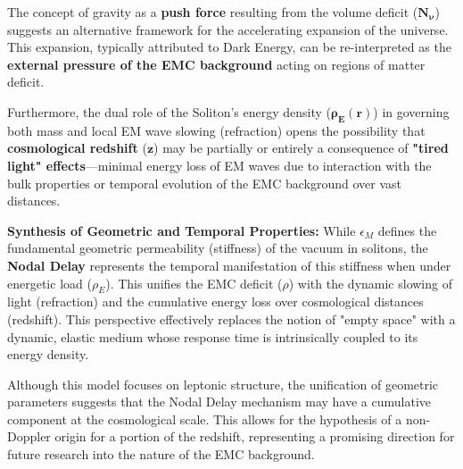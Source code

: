\documentclass[10pt,a4paper]{article}
\begin{document}
The concept of gravity as a \textbf{push force} resulting from the volume deficit ($\mathbf{N_{\nu}}$) suggests an alternative framework for the accelerating expansion of the universe. This expansion, typically attributed to Dark Energy, can be re-interpreted as the \textbf{external pressure of the EMC background} acting on regions of matter deficit.

Furthermore, the dual role of the Soliton's energy density ($\mathbf{\rho_{\text{E}}(r)}$) in governing both mass and local EM wave slowing (refraction) opens the possibility that \textbf{cosmological redshift} ($\mathbf{z}$) may be partially or entirely a consequence of \textbf{"tired light" effects}—minimal energy loss of EM waves due to interaction with the bulk properties or temporal evolution of the EMC background over vast distances. 



\textbf{Synthesis of Geometric and Temporal Properties:}
While $\epsilon_M$ defines the fundamental geometric permeability (stiffness) of the vacuum in solitons, the \textbf{Nodal Delay} represents the temporal manifestation of this stiffness when under energetic load ($\rho_E$). This unifies the EMC deficit ($\rho$) with the dynamic slowing of light (refraction) and the cumulative energy loss over cosmological distances (redshift). This perspective effectively replaces the notion of "empty space" with a dynamic, elastic medium whose response time is intrinsically coupled to its energy density.

Although this model focuses on leptonic structure, the unification of geometric parameters suggests that the Nodal Delay mechanism may have a cumulative component at the cosmological scale. This allows for the hypothesis of a non-Doppler origin for a portion of the redshift, representing a promising direction for future research into the nature of the EMC background.


%
\end{document}
